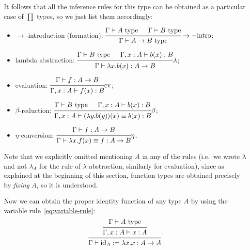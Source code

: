It follows that all the inference rules for this type can be obtained
as a particular case of $ \prod $ types, so we just list them accordingly:
\begin{itemize}
\item $ \to $-introduction (formation):
$ \begin{prooftree}
  \hypo{\Gamma \vdash A \text{ type}}
  \hypo{\Gamma \vdash B \text{ type}}
  \infer2{\Gamma \vdash A \to B \text{ type}}
\end{prooftree}\to-\text{intro}
$;
\item lambda abstraction:
$ \begin{prooftree}
  \hypo{\Gamma \vdash B \text{ type}}
  \hypo{\Gamma, x : A \vdash b(x) : B}
  \infer2{\Gamma \vdash \lambda x . b(x) : A \to B}
\end{prooftree}\lambda
$;
\item evaluation:
$ \begin{prooftree}
  \hypo{\Gamma \vdash f : A \to B}
  \infer1{\Gamma, x : A \vdash f(x) :B}
\end{prooftree}\text{ev}
$;
\item $ \beta $-reduction:
$ \begin{prooftree}
  \hypo{\Gamma \vdash B \text{ type}}
  \hypo{\Gamma, x : A \vdash b(x) : B}
  \infer2{\Gamma, x : A \vdash (\lambda y . b(y))(x) \equiv b(x) : B}
\end{prooftree}\beta
$;
\item $ \eta $-conversion:
$ \begin{prooftree}
  \hypo{\Gamma \vdash f : A \to B}
  \infer1{\Gamma \vdash \lambda x . f(x) \equiv f : A \to B}
\end{prooftree}\eta
$.
\end{itemize}

Note that we explicitly omitted mentioning $ A $ in any of the rules
(i.e.\ we wrote $ \lambda $ and not $ \lambda_A $ for the rule of 
$ \lambda $-abstraction, similarly for evaluation), since as explained
at the beginning of this section, function types are obtained precisely
by \emph{fixing} $ A $, so it is understood.

Now we can obtain the proper identity function of any type $ A $ by using
the variable rule~\eqref{eq:variable-rule}:
\[
  \begin{prooftree}
    \hypo{\Gamma \vdash A \text{ type}}
    \infer1{\Gamma, x : A \vdash x : A}
    \infer1{\Gamma \vdash \dr{id}_A := \lambda x . x : A \to A}
  \end{prooftree}.
\]


